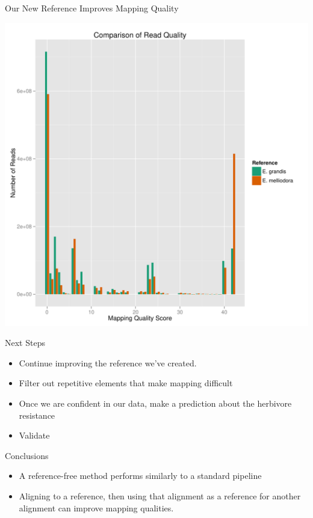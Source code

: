 \documentclass{beamer}
\begin{document}
\begin{frame}{Our New Reference Improves Mapping Quality}
\begin{center}
\includegraphics[height=.9\textheight]{figures/both_hist.pdf}
\end{center}
\end{frame}

\begin{frame}{Next Steps}
\begin{itemize}
\item Continue improving the reference we've created.
\item Filter out repetitive elements that make mapping difficult
\item Once we are confident in our data, make a prediction about the herbivore resistance
\item Validate
\end{itemize}
\end{frame}

\begin{frame}{Conclusions}
\begin{itemize}
\item A reference-free method performs similarly to a standard pipeline
\item Aligning to a reference, then using that alignment as a reference for another alignment can improve mapping qualities.
\end{itemize}
\end{frame}
\end{document}
